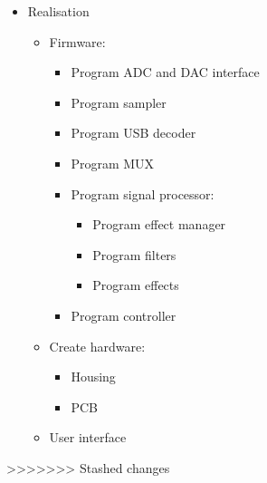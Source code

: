 \begin{itemize}
\begin{itemize}
	\end{itemize}
	\item Realisation
	\begin{itemize}
		\setlength\itemsep{-0.3em}
		\item Firmware:
		\begin{itemize}
			\setlength\itemsep{-0.3em}
			\item Program ADC and DAC interface
			\item Program sampler
			\item Program USB decoder
			\item Program MUX
			\item Program signal processor:
			\begin{itemize}
				\setlength\itemsep{-0.3em}
				\item Program effect manager
				\item Program filters
				\item Program effects
			\end{itemize}
			\item Program controller 
		\end{itemize}
		\item Create hardware:
		\begin{itemize}
			\setlength\itemsep{-0.3em}
			\item Housing
			\item PCB
		\end{itemize}
		\item User interface 
	\end{itemize}
\end{itemize} 


>>>>>>> Stashed changes
